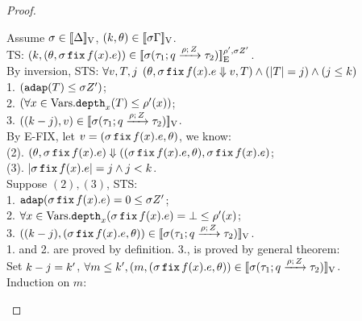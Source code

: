 \documentclass[a4paper,11pt]{article}
\theoremstyle{definition}
\begin{document}
\begin{proof}
\begin{mainitem}
Assume $ \ienv \in \lrv{\Delta}$, $(\stepiA, \env) \in \lrv{\ienv \Gamma}$.\\
%
TS: $(\stepiA, (\env, \ienv \efix f(x). \expr)) \in \lre{\dmap'}{\ienv \nnatA'}{\ienv (\tarr{\type_1}{\type_2}{\nnatbiA}{\dmap}{\nnatA}) }$.\\
%
By inversion, 
STS: $\forall \valr, \tr, j$ 
$(\env, \ienv \efix f(x). \expr \bigstep \valr, \tr) \land (\size{\tr} = j) \land (j \leq \stepiA)$\\
%
1. $(\adap(\tr) \leq \ienv \nnatA') $;\\
%
2. $ (\forall x \in \mbox{Vars}. \ddep{x}(\tr) \leq \dmap'(x)) $;\\
%
3. $ ((\stepiA - j), \valr) \in \lrv{\ienv  (\tarr{\type_1}{\type_2}{\nnatbiA}{\dmap}{\nnatA})}$.\\
%
By E-FIX, let $\valr = (\ienv \efix f(x). \expr, \env)$, we know:\\
%
(2). $(\env, \ienv \efix f(x). \expr) \bigstep ((\ienv \efix f(x). \expr, \env), \ienv \efix f(x). \expr) $;\\
%
(3). $|\ienv \efix f(x). \expr|= j \land j < \stepiA$.\\
%
Suppose $(2), (3)$, STS:\\
%
1. $ \adap(\ienv \efix f(x). \expr) = 0 \leq \ienv \nnatA'$;\\
%
2. $ \forall x \in \mbox{Vars}. \ddep{x}(\ienv \efix f(x). \expr) = \bot \leq \dmap'(x) $;\\
%
3. $((\stepiA -j), (\ienv \efix f(x). \expr, \env)) \in \lrv{\ienv (\tarr{\type_1}{\type_2}{\nnatbiA}{\dmap}{\nnatA})}$.\\
%
1. and 2. are proved by definition.
3., is proved by general theorem: \\
%
Set $\stepiA - j = \stepiA'$, $\forall m \leq \stepiA', (m, (\ienv \efix f(x). \expr, \env)) \in \lrv{\ienv (\tarr{\type_1}{\type_2}{\nnatbiA}{\dmap}{\nnatA})}$.\\
%
Induction on $m$:


\end{mainitem}
\end{proof}
\end{document}
